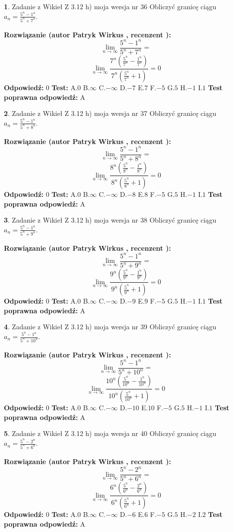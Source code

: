 \documentclass[12pt, a4paper]{article}
\theoremstyle{definition} %
\newtheorem{zad}{}
\newcommand{\zadStart}[1]{\begin{zad}#1\newline}
\newcommand{\zadStop}{\end{zad}}
\newcommand{\rozwStart}[2]{\noindent \textbf{Rozwiązanie (autor #1 , recenzent #2): }\newline}
\newcommand{\rozwStop}{\newline}
\newcommand{\odpStart}{\noindent \textbf{Odpowiedź:}\newline}
\newcommand{\odpStop}{\newline}
\newcommand{\testStart}{\noindent \textbf{Test:}\newline}
\newcommand{\testStop}{\newline}
\newcommand{\kluczStart}{\noindent \textbf{Test poprawna odpowiedź:}\newline}
\newcommand{\kluczStop}{\newline}
\begin{document}
\zadStart{Zadanie z Wikieł Z 3.12 h) moja wersja nr 36}
Obliczyć granicę ciągu $a_{n}=\frac{5^{n} - 1^{n}}{5^{n} + 7^{n}}$.
\zadStop
\rozwStart{Patryk Wirkus}{}
$$\lim\limits_{n\to\infty}\frac{5^{n} - 1^{n}}{5^{n} + 7^{n}}=$$
$$\lim\limits_{n\to\infty}\frac{7^{n}(\frac{5^{n}}{7^{n}} - \frac{1^{n}}{7^{n}})}{7^{n}(\frac{5^{n}}{7^{n}} + 1)} = 0$$
\rozwStop
\odpStart
$0$
\odpStop
\testStart
A.$0$
B.$\infty$
C.$-\infty$
D.$-7$
E.$7$
F.$-5$
G.$5$
H.$-1$
I.$1$
\testStop
\kluczStart
A
\kluczStop



\zadStart{Zadanie z Wikieł Z 3.12 h) moja wersja nr 37}
Obliczyć granicę ciągu $a_{n}=\frac{5^{n} - 1^{n}}{5^{n} + 8^{n}}$.
\zadStop
\rozwStart{Patryk Wirkus}{}
$$\lim\limits_{n\to\infty}\frac{5^{n} - 1^{n}}{5^{n} + 8^{n}}=$$
$$\lim\limits_{n\to\infty}\frac{8^{n}(\frac{5^{n}}{8^{n}} - \frac{1^{n}}{8^{n}})}{8^{n}(\frac{5^{n}}{8^{n}} + 1)} = 0$$
\rozwStop
\odpStart
$0$
\odpStop
\testStart
A.$0$
B.$\infty$
C.$-\infty$
D.$-8$
E.$8$
F.$-5$
G.$5$
H.$-1$
I.$1$
\testStop
\kluczStart
A
\kluczStop



\zadStart{Zadanie z Wikieł Z 3.12 h) moja wersja nr 38}
Obliczyć granicę ciągu $a_{n}=\frac{5^{n} - 1^{n}}{5^{n} + 9^{n}}$.
\zadStop
\rozwStart{Patryk Wirkus}{}
$$\lim\limits_{n\to\infty}\frac{5^{n} - 1^{n}}{5^{n} + 9^{n}}=$$
$$\lim\limits_{n\to\infty}\frac{9^{n}(\frac{5^{n}}{9^{n}} - \frac{1^{n}}{9^{n}})}{9^{n}(\frac{5^{n}}{9^{n}} + 1)} = 0$$
\rozwStop
\odpStart
$0$
\odpStop
\testStart
A.$0$
B.$\infty$
C.$-\infty$
D.$-9$
E.$9$
F.$-5$
G.$5$
H.$-1$
I.$1$
\testStop
\kluczStart
A
\kluczStop



\zadStart{Zadanie z Wikieł Z 3.12 h) moja wersja nr 39}
Obliczyć granicę ciągu $a_{n}=\frac{5^{n} - 1^{n}}{5^{n} + 10^{n}}$.
\zadStop
\rozwStart{Patryk Wirkus}{}
$$\lim\limits_{n\to\infty}\frac{5^{n} - 1^{n}}{5^{n} + 10^{n}}=$$
$$\lim\limits_{n\to\infty}\frac{10^{n}(\frac{5^{n}}{10^{n}} - \frac{1^{n}}{10^{n}})}{10^{n}(\frac{5^{n}}{10^{n}} + 1)} = 0$$
\rozwStop
\odpStart
$0$
\odpStop
\testStart
A.$0$
B.$\infty$
C.$-\infty$
D.$-10$
E.$10$
F.$-5$
G.$5$
H.$-1$
I.$1$
\testStop
\kluczStart
A
\kluczStop



\zadStart{Zadanie z Wikieł Z 3.12 h) moja wersja nr 40}
Obliczyć granicę ciągu $a_{n}=\frac{5^{n} - 2^{n}}{5^{n} + 6^{n}}$.
\zadStop
\rozwStart{Patryk Wirkus}{}
$$\lim\limits_{n\to\infty}\frac{5^{n} - 2^{n}}{5^{n} + 6^{n}}=$$
$$\lim\limits_{n\to\infty}\frac{6^{n}(\frac{5^{n}}{6^{n}} - \frac{2^{n}}{6^{n}})}{6^{n}(\frac{5^{n}}{6^{n}} + 1)} = 0$$
\rozwStop
\odpStart
$0$
\odpStop
\testStart
A.$0$
B.$\infty$
C.$-\infty$
D.$-6$
E.$6$
F.$-5$
G.$5$
H.$-2$
I.$2$
\testStop
\kluczStart
A
\kluczStop
\end{document}
